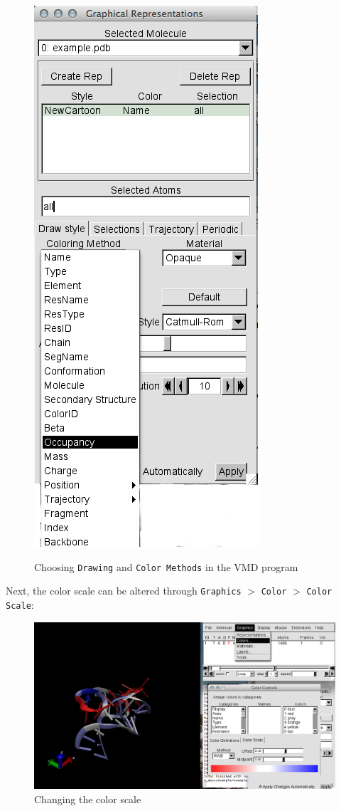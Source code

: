 \documentclass[12pt]{article}
\begin{document}
\begin{figure} [h!]
\begin{center}
{\includegraphics[scale=0.3]{pictures/vmd5.png}}
\end{center}
\caption{Choosing \texttt{Drawing} and \texttt{Color Methods} in the VMD program}
\end{figure} 

\newpage
Next, the color scale can be altered through \texttt{Graphics} $>$ \texttt{Color} $>$ \texttt{Color Scale}:

\begin{figure}[h!]
\centering
\includegraphics[scale=0.4]{./pictures/vmd6.png}
\caption{Changing the color scale}
\end{figure}
\end{document}
